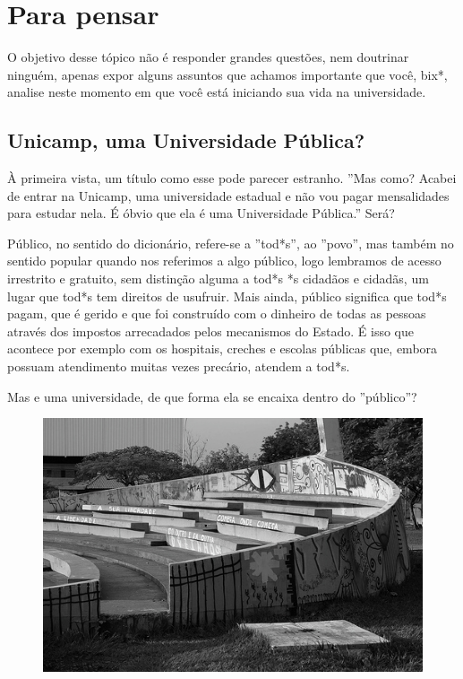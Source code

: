 
\section{Para pensar}

O objetivo desse tópico não é responder grandes questões, nem doutrinar ninguém,
apenas expor alguns assuntos que achamos importante que você, bix*, analise
neste momento em que você está iniciando sua vida na universidade.

\subsection*{Unicamp, uma Universidade Pública?}

À primeira vista, um título como esse pode parecer estranho. ''Mas como? Acabei
de entrar na Unicamp, uma universidade estadual e não vou pagar mensalidades
para estudar nela. É óbvio que ela é uma Universidade Pública.'' Será?

Público, no sentido do dicionário, refere-se a ''tod*s'', ao ''povo'', mas
também no sentido popular quando nos referimos a algo público, logo lembramos de
acesso irrestrito e gratuito, sem distinção alguma a tod*s *s cidadãos e
cidadãs, um lugar que tod*s tem direitos de usufruir. Mais ainda, público
significa que tod*s pagam, que é gerido e que foi construído com o dinheiro de
todas as pessoas através dos impostos arrecadados pelos mecanismos do Estado. É
isso que acontece por exemplo com os hospitais, creches e escolas públicas que,
embora possuam atendimento muitas vezes precário, atendem a tod*s.

Mas e uma universidade, de que forma ela se encaixa dentro do ''público''?

\begin{figure}[h!]
    \centering
    \includegraphics[width=.45\textwidth]{img/ola_mundo/teatro_de_arena.jpg}
\end{figure}

